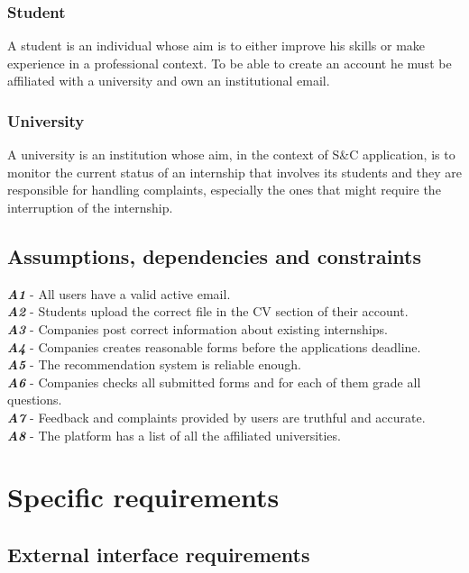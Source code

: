 \documentclass[11pt,twoside]{article}
\begin{document}
		\subsubsection{Student}
A student is an individual whose aim is to either improve his skills or make experience in a professional context. To be able to create an account he must be affiliated with a university and own an institutional email.
		\subsubsection{University}
A university is an institution whose aim, in the context of S\&C application, is to monitor the current status of an internship that involves its students and they are responsible for handling complaints, especially the ones that might require the interruption of the internship.

	\subsection{Assumptions, dependencies and constraints}
\begin{spacing}{1.5}
\textbf{\textit{A1}} - All users have a valid active email. \\
\textbf{\textit{A2}} - Students upload the correct file in the CV section of their account. \\
\textbf{\textit{A3}} - Companies post correct information about existing internships. \\
\textbf{\textit{A4}} - Companies creates reasonable forms before the applications deadline. \\
\textbf{\textit{A5}} - The recommendation system is reliable enough. \\
\textbf{\textit{A6}} - Companies checks all submitted forms and for each of them grade all questions. \\
\textbf{\textit{A7}} - Feedback and complaints provided by users are truthful and accurate. \\
\textbf{\textit{A8}} - The platform has a list of all the affiliated universities.
\end{spacing}
\newpage
\section{Specific requirements}
	\subsection{External interface requirements}
\end{document}

